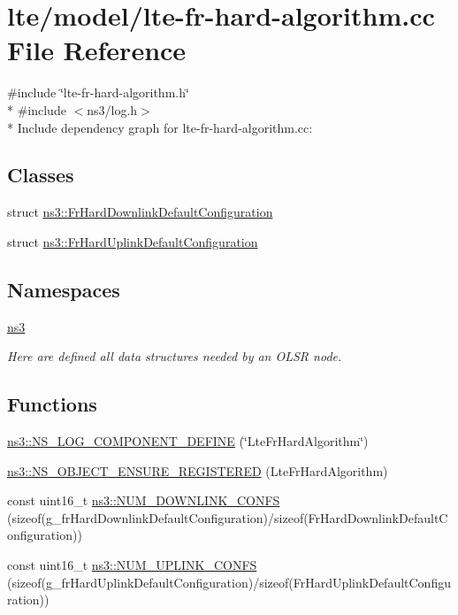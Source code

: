 \hypertarget{lte-fr-hard-algorithm_8cc}{}\section{lte/model/lte-\/fr-\/hard-\/algorithm.cc File Reference}
\label{lte-fr-hard-algorithm_8cc}
{\ttfamily \#include \char`\"{}lte-\/fr-\/hard-\/algorithm.\+h\char`\"{}}\\*
{\ttfamily \#include $<$ns3/log.\+h$>$}\\*
Include dependency graph for lte-\/fr-\/hard-\/algorithm.cc\+:
\subsection*{Classes}
\begin{DoxyCompactItemize}
\item 
struct \hyperlink{structns3_1_1FrHardDownlinkDefaultConfiguration}{ns3\+::\+Fr\+Hard\+Downlink\+Default\+Configuration}
\item 
struct \hyperlink{structns3_1_1FrHardUplinkDefaultConfiguration}{ns3\+::\+Fr\+Hard\+Uplink\+Default\+Configuration}
\end{DoxyCompactItemize}
\subsection*{Namespaces}
\begin{DoxyCompactItemize}
\item 
 \hyperlink{namespacens3}{ns3}
\begin{DoxyCompactList}\small\item\em Here are defined all data structures needed by an O\+L\+SR node. \end{DoxyCompactList}\end{DoxyCompactItemize}
\subsection*{Functions}
\begin{DoxyCompactItemize}
\item 
\hyperlink{namespacens3_afbedf08d3709e29b36824b7cde1f2079}{ns3\+::\+N\+S\+\_\+\+L\+O\+G\+\_\+\+C\+O\+M\+P\+O\+N\+E\+N\+T\+\_\+\+D\+E\+F\+I\+NE} (\char`\"{}Lte\+Fr\+Hard\+Algorithm\char`\"{})
\item 
\hyperlink{namespacens3_a0f8bcef1442c6f476e9a91d8123f652d}{ns3\+::\+N\+S\+\_\+\+O\+B\+J\+E\+C\+T\+\_\+\+E\+N\+S\+U\+R\+E\+\_\+\+R\+E\+G\+I\+S\+T\+E\+R\+ED} (Lte\+Fr\+Hard\+Algorithm)
\item 
const uint16\+\_\+t \hyperlink{namespacens3_a12d34327bd854d87f4dd991ec3d3a94b}{ns3\+::\+N\+U\+M\+\_\+\+D\+O\+W\+N\+L\+I\+N\+K\+\_\+\+C\+O\+N\+FS} (sizeof(g\+\_\+fr\+Hard\+Downlink\+Default\+Configuration)/sizeof(Fr\+Hard\+Downlink\+Default\+Configuration))
\item 
const uint16\+\_\+t \hyperlink{namespacens3_ad2db9ead96d78b8ce04fddc9272e4220}{ns3\+::\+N\+U\+M\+\_\+\+U\+P\+L\+I\+N\+K\+\_\+\+C\+O\+N\+FS} (sizeof(g\+\_\+fr\+Hard\+Uplink\+Default\+Configuration)/sizeof(Fr\+Hard\+Uplink\+Default\+Configuration))
\end{DoxyCompactItemize}
